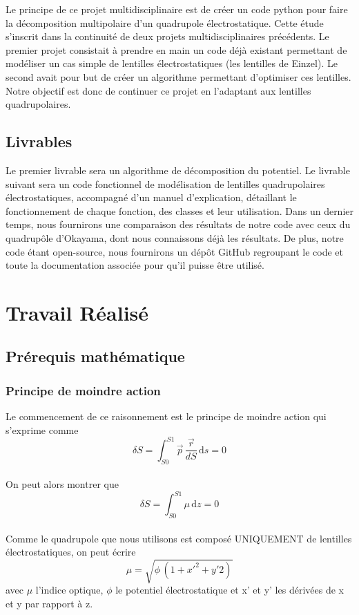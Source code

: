\documentclass{report}
\begin{document}
Le principe de ce projet multidisciplinaire est de créer un code python pour faire la décomposition 
multipolaire d'un quadrupole électrostatique.  
Cette étude s’inscrit dans la continuité de deux projets multidisciplinaires précédents. Le 
premier projet consistait à prendre en main un code déjà existant permettant de modéliser un 
cas simple de lentilles électrostatiques (les lentilles de Einzel). Le second avait pour but de 
créer un algorithme permettant d’optimiser ces lentilles.  
Notre objectif est donc de continuer ce projet en l’adaptant aux lentilles quadrupolaires.  
   



\section{Livrables}
Le premier livrable sera un algorithme de décomposition du potentiel. 
Le livrable suivant sera un code fonctionnel de modélisation de lentilles quadrupolaires 
électrostatiques, accompagné d’un manuel d’explication, détaillant le fonctionnement de 
chaque fonction, des classes et leur utilisation. 
Dans un dernier temps, nous fournirons une comparaison des résultats de notre code avec 
ceux du quadrupôle d’Okayama, dont nous connaissons déjà les résultats. 
De plus, notre code étant open-source, nous fournirons un dépôt GitHub regroupant le code 
et toute la documentation associée pour qu’il puisse être utilisé. 


\chapter{Travail Réalisé}
\section{Prérequis mathématique}
\subsection {Principe de moindre action}
Le commencement de ce raisonnement est le principe de moindre action qui s'exprime comme 
\[
\delta S = \int_{S0}^{S1} \vec{p}\,\frac{\vec{r}}{dS} \, \mathrm{d}s = 0
\]
\\
On peut alors montrer que 
\[
\delta S = \int_{S0}^{S1} \mu\,\mathrm{d}z = 0
\]
\\
Comme le quadrupole que nous utilisons est composé UNIQUEMENT de lentilles électrostatiques, on peut écrire
\[
\mu = \sqrt{\phi \, (1+x'^2+y'2)}
\]
avec $\mu$ l'indice optique, $\phi$ le potentiel électrostatique et x' et y' les dérivées de x et y par
rapport à z.
\end{document}
